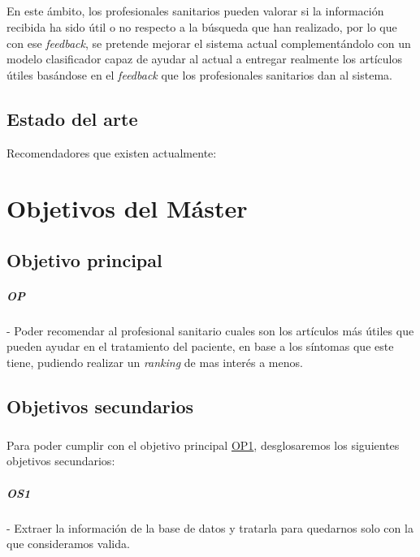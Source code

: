 \documentclass[10pt,a4paper,oneside]{book}
\begin{document}
\paragraph{}
En este ámbito, los profesionales sanitarios pueden valorar si la información recibida ha sido útil o no respecto a la búsqueda que han realizado, por lo que con ese \textit{feedback}, se pretende mejorar el sistema actual complementándolo con un modelo clasificador capaz de ayudar al actual a entregar realmente los artículos útiles basándose en el \textit{feedback} que los profesionales sanitarios dan al sistema.


\section{Estado del arte}
Recomendadores que existen actualmente:


\chapter{Objetivos del Máster}

\section{Objetivo principal}

\label{op:OP1}
\paragraph{OP} - Poder recomendar al profesional sanitario cuales son los artículos más útiles que pueden ayudar en el tratamiento del paciente, en base a los síntomas que este tiene, pudiendo realizar un \textit{ranking} de mas interés a menos.

\section{Objetivos secundarios}

\paragraph{}
Para poder cumplir con el objetivo principal \hyperref[op:OP1]{OP1}, desglosaremos los siguientes objetivos secundarios:

\label{os:OS1}
\paragraph{OS1} - Extraer la información de la base de datos y tratarla para quedarnos solo con la que consideramos valida.
\end{document}

